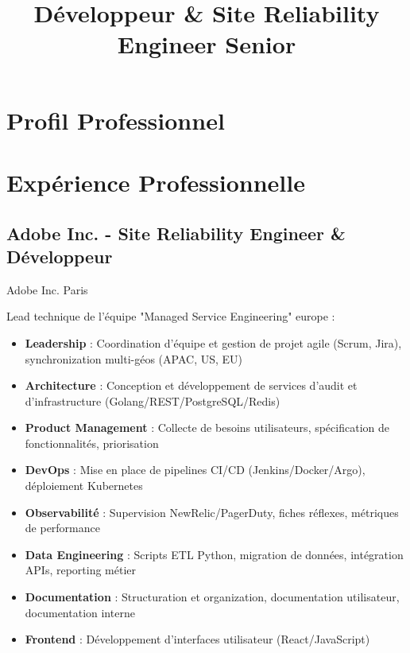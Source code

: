 \documentclass[10pt,a4paper,sans]{moderncv}
\title{Développeur \& Site Reliability Engineer Senior}
\begin{document}
\maketitle

\section{Profil Professionnel}

\section{Expérience Professionnelle}

\subsection{Adobe Inc. - Site Reliability Engineer \& Développeur}
        {Adobe Inc.}
        {Paris}
        {}
        {Lead technique de l'équipe "Managed Service Engineering" europe :
            \begin{itemize}
            \item \textbf{Leadership} : Coordination d'équipe et gestion de projet agile (Scrum, Jira), synchronization multi-géos (APAC, US, EU)
            \item \textbf{Architecture} : Conception et développement de services d'audit et d'infrastructure (Golang/REST/PostgreSQL/Redis)
            \item \textbf{Product Management} : Collecte de besoins utilisateurs, spécification de fonctionnalités, priorisation
            \item \textbf{DevOps} : Mise en place de pipelines CI/CD (Jenkins/Docker/Argo), déploiement Kubernetes
            \item \textbf{Observabilité} : Supervision NewRelic/PagerDuty, fiches réflexes, métriques de performance
            \item \textbf{Data Engineering} : Scripts ETL Python, migration de données, intégration APIs, reporting métier
            \item \textbf{Documentation} : Structuration et organization, documentation utilisateur, documentation interne
            \item \textbf{Frontend} : Développement d'interfaces utilisateur (React/JavaScript)
            \end{itemize}
        }
\end{document}
